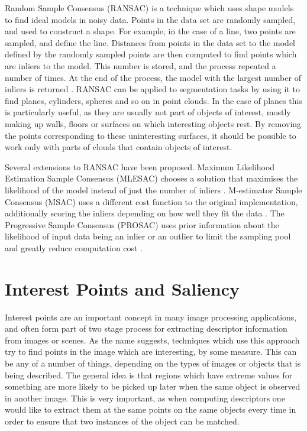 \documentclass[11pt,a4paper]{kth-mag}
\begin{document}
Random Sample Consensus (RANSAC) is a technique which uses shape models to find
ideal models in noisy data. Points in the data set are randomly sampled, and
used to construct a shape. For example, in the case of a line, two points are
sampled, and define the line. Distances from points in the data set to the model
defined by the randomly sampled points are then computed to find points which
are inliers to the model. This number is stored, and the process repeated a
number of times. At the end of the process, the model with the largest number of
inliers is returned \cite{fischler1981random}. RANSAC can be applied to
segmentation tasks by using it to find planes, cylinders, spheres and so on in
point clouds. In the case of planes this is particularly useful, as they are
usually not part of objects of interest, mostly making up walls, floors or
surfaces on which interesting objects rest. By removing the points corresponding
to these uninteresting surfaces, it should be possible to work only with parts
of clouds that contain objects of interest.

Several extensions to RANSAC have been proposed. Maximum Likelihood Estimation
Sample Consensus (MLESAC) chooses a solution that maximises the likelihood of
the model instead of just the number of inliers \cite{torr2000mlesac}.
M-estimator Sample Consensus (MSAC) uses a different cost function to the
original implementation, additionally scoring the inliers depending on how well
they fit the data \cite{torr2000mlesac}. The Progressive Sample Consensus
(PROSAC) uses prior information about the likelihood of input data being an
inlier or an outlier to limit the sampling pool and greatly reduce computation
cost \cite{chum2005matching}.


\section{Interest Points and Saliency}
Interest points are an important concept in many image processing applications,
and often form part of two stage process for extracting descriptor information
from images or scenes. As the name suggests, techniques which use this approach
try to find points in the image which are interesting, by some measure. This can
be any of a number of things, depending on the types of images or objects that
is being described. The general idea is that regions which have extreme values
for something are more likely to be picked up later when the same object is
observed in another image. This is very important, as when computing descriptors
one would like to extract them at the same points on the same objects every time
in order to ensure that two instances of the object can be matched.
\end{document}
